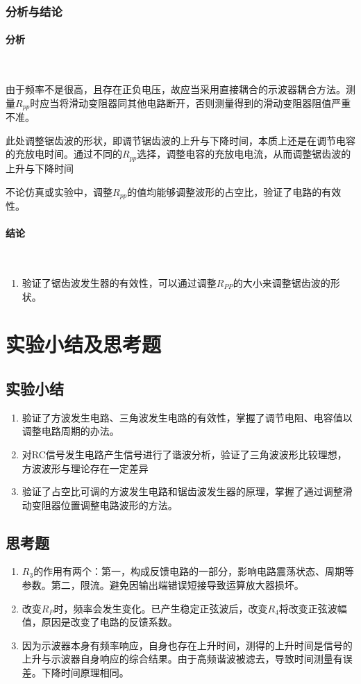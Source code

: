\documentclass[UTF8]{ctexart}
\numberwithin{figure}{subsection}
\numberwithin{table}{subsection}
\numberwithin{equation}{subsection}
\begin{document}
\subsubsection{分析与结论}
\paragraph{分析}~{}
\par 由于频率不是很高，且存在正负电压，故应当采用直接耦合的示波器耦合方法。测量\(R_{pp}\)时应当将滑动变阻器同其他电路断开，否则测量得到的滑动变阻器阻值严重不准。
\par 此处调整锯齿波的形状，即调节锯齿波的上升与下降时间，本质上还是在调节电容的充放电时间。通过不同的\(R_{pp}\)选择，调整电容的充放电电流，从而调整锯齿波的上升与下降时间
\par 不论仿真或实验中，调整\(R_{pp}\)的值均能够调整波形的占空比，验证了电路的有效性。
\paragraph{结论}~{}
\par 
\begin{enumerate}
    \item 验证了锯齿波发生器的有效性，可以通过调整\(R_{PP}\)的大小来调整锯齿波的形状。
\end{enumerate}

\section{实验小结及思考题}
\subsection{实验小结}
\begin{enumerate}
    \item 验证了方波发生电路、三角波发生电路的有效性，掌握了调节电阻、电容值以调整电路周期的办法。
    \item 对RC信号发生电路产生信号进行了谐波分析，验证了三角波波形比较理想，方波波形与理论存在一定差异
    \item 验证了占空比可调的方波发生电路和锯齿波发生器的原理，掌握了通过调整滑动变阻器位置调整电路波形的方法。
\end{enumerate}

\subsection{思考题}
\begin{enumerate}
    \item \(R_3\)的作用有两个：第一，构成反馈电路的一部分，影响电路震荡状态、周期等参数。第二，限流。避免因输出端错误短接导致运算放大器损坏。
    \item 改变\(R_P\)时，频率会发生变化。已产生稳定正弦波后，改变\(R_4\)将改变正弦波幅值，原因是改变了电路的反馈系数。
    \item 因为示波器本身有频率响应，自身也存在上升时间，测得的上升时间是信号的上升与示波器自身响应的综合结果。由于高频谐波被滤去，导致时间测量有误差。下降时间原理相同。
\end{enumerate}
\end{document}
